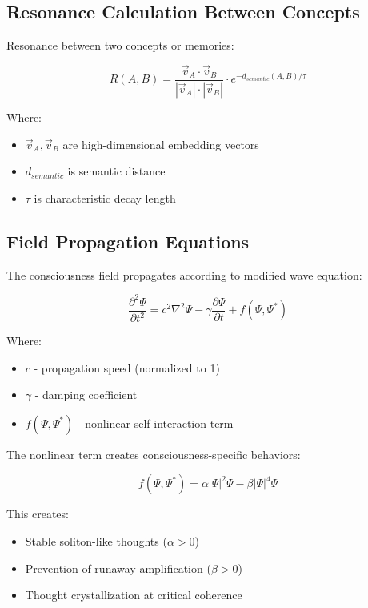 \documentclass[12pt,a4paper]{article}
\begin{document}
\subsection{Resonance Calculation Between Concepts}

Resonance between two concepts or memories:

\begin{equation}
R(A, B) = \frac{\vec{v}_A \cdot \vec{v}_B}{|\vec{v}_A| \cdot |\vec{v}_B|} \cdot e^{-d_{semantic}(A,B)/\tau}
\end{equation}

Where:
\begin{itemize}
    \item $\vec{v}_A, \vec{v}_B$ are high-dimensional embedding vectors
    \item $d_{semantic}$ is semantic distance
    \item $\tau$ is characteristic decay length
\end{itemize}

\subsection{Field Propagation Equations}

The consciousness field propagates according to modified wave equation:

\begin{equation}
\frac{\partial^2 \Psi}{\partial t^2} = c^2 \nabla^2 \Psi - \gamma \frac{\partial \Psi}{\partial t} + f(\Psi, \Psi^*)
\end{equation}

Where:
\begin{itemize}
    \item $c$ - propagation speed (normalized to 1)
    \item $\gamma$ - damping coefficient
    \item $f(\Psi, \Psi^*)$ - nonlinear self-interaction term
\end{itemize}

The nonlinear term creates consciousness-specific behaviors:

\begin{equation}
f(\Psi, \Psi^*) = \alpha |\Psi|^2 \Psi - \beta |\Psi|^4 \Psi
\end{equation}

This creates:
\begin{itemize}
    \item Stable soliton-like thoughts ($\alpha > 0$)
    \item Prevention of runaway amplification ($\beta > 0$)
    \item Thought crystallization at critical coherence
\end{itemize}
\end{document}
